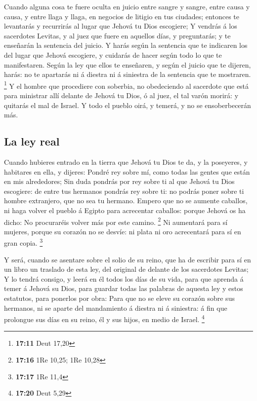  Cuando alguna cosa te fuere oculta en juicio entre sangre y
sangre, entre causa y causa, y entre llaga y llaga, en negocios de
litigio en tus ciudades; entonces te levantarás y recurrirás al lugar
que Jehová tu Dios escogiere;  Y vendrás á los sacerdotes
Levitas, y al juez que fuere en aquellos días, y preguntarás; y te
enseñarán la sentencia del juicio.  Y harás según la
sentencia que te indicaren los del lugar que Jehová escogiere, y
cuidarás de hacer según todo lo que te manifestaren.  Según
la ley que ellos te enseñaren, y según el juicio que te dijeren, harás:
no te apartarás ni á diestra ni á siniestra de la sentencia que te
mostraren. \footnote{\textbf{17:11} Deut 17,20}  Y el
hombre que procediere con soberbia, no obedeciendo al sacerdote que está
para ministrar allí delante de Jehová tu Dios, ó al juez, el tal varón
morirá: y quitarás el mal de Israel.  Y todo el pueblo
oirá, y temerá, y no se ensoberbecerán más.

\hypertarget{la-ley-real}{%
\subsection{La ley real}\label{la-ley-real}}

 Cuando hubieres entrado en la tierra que Jehová tu Dios te
da, y la poseyeres, y habitares en ella, y dijeres: Pondré rey sobre mí,
como todas las gentes que están en mis alrededores;  Sin
duda pondrás por rey sobre ti al que Jehová tu Dios escogiere: de entre
tus hermanos pondrás rey sobre ti: no podrás poner sobre ti hombre
extranjero, que no sea tu hermano.  Empero que no se
aumente caballos, ni haga volver el pueblo á Egipto para acrecentar
caballos: porque Jehová os ha dicho: No procuraréis volver más por este
camino. \footnote{\textbf{17:16} 1Re 10,25; 1Re 10,28}  Ni
aumentará para sí mujeres, porque su corazón no se desvíe: ni plata ni
oro acrecentará para sí en gran copia. \footnote{\textbf{17:17} 1Re 11,4}

 Y será, cuando se asentare sobre el solio de su reino, que
ha de escribir para sí en un libro un traslado de esta ley, del original
de delante de los sacerdotes Levitas;  Y lo tendrá consigo,
y leerá en él todos los días de su vida, para que aprenda á temer á
Jehová su Dios, para guardar todas las palabras de aquesta ley y estos
estatutos, para ponerlos por obra:  Para que no se eleve su
corazón sobre sus hermanos, ni se aparte del mandamiento á diestra ni á
siniestra: á fin que prolongue sus días en su reino, él y sus hijos, en
medio de Israel. \footnote{\textbf{17:20} Deut 5,29}

